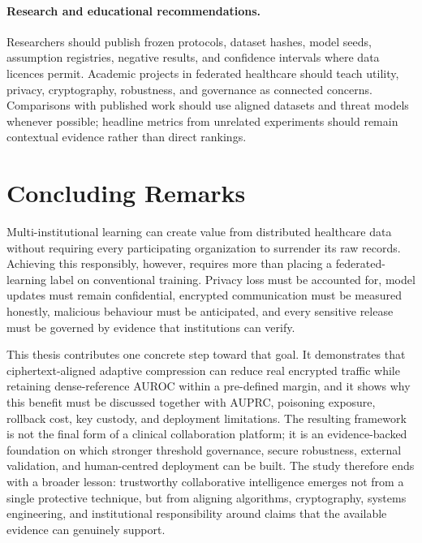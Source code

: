 \paragraph{Research and educational recommendations.}
Researchers should publish frozen protocols, dataset hashes, model seeds, assumption registries, negative results, and confidence intervals where data licences permit. Academic projects in federated healthcare should teach utility, privacy, cryptography, robustness, and governance as connected concerns. Comparisons with published work should use aligned datasets and threat models whenever possible; headline metrics from unrelated experiments should remain contextual evidence rather than direct rankings.

\section{Concluding Remarks}
\label{sec:concluding-remarks}

Multi-institutional learning can create value from distributed healthcare data without requiring every participating organization to surrender its raw records. Achieving this responsibly, however, requires more than placing a federated-learning label on conventional training. Privacy loss must be accounted for, model updates must remain confidential, encrypted communication must be measured honestly, malicious behaviour must be anticipated, and every sensitive release must be governed by evidence that institutions can verify.

This thesis contributes one concrete step toward that goal. It demonstrates that ciphertext-aligned adaptive compression can reduce real encrypted traffic while retaining dense-reference AUROC within a pre-defined margin, and it shows why this benefit must be discussed together with AUPRC, poisoning exposure, rollback cost, key custody, and deployment limitations. The resulting framework is not the final form of a clinical collaboration platform; it is an evidence-backed foundation on which stronger threshold governance, secure robustness, external validation, and human-centred deployment can be built. The study therefore ends with a broader lesson: trustworthy collaborative intelligence emerges not from a single protective technique, but from aligning algorithms, cryptography, systems engineering, and institutional responsibility around claims that the available evidence can genuinely support.

